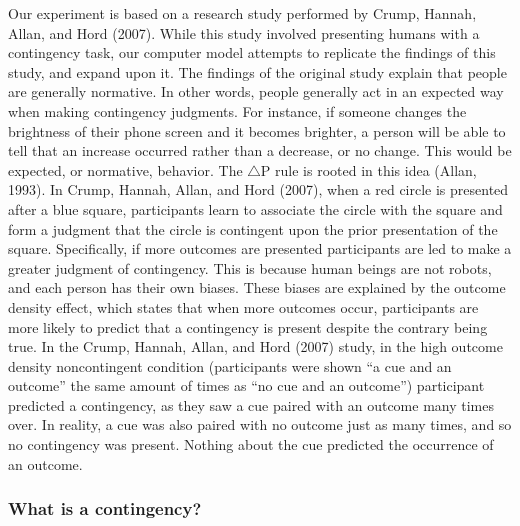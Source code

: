 \documentclass[
  english,
  man,floatsintext]{apa6}
\begin{document}
Our experiment is based on a research study performed by Crump, Hannah, Allan, and Hord (2007). While this study involved presenting humans with a contingency task, our computer model attempts to replicate the findings of this study, and expand upon it. The findings of the original study explain that people are generally normative. In other words, people generally act in an expected way when making contingency judgments. For instance, if someone changes the brightness of their phone screen and it becomes brighter, a person will be able to tell that an increase occurred rather than a decrease, or no change. This would be expected, or normative, behavior. The \(\triangle\)P rule is rooted in this idea (Allan, 1993). In Crump, Hannah, Allan, and Hord (2007), when a red circle is presented after a blue square, participants learn to associate the circle with the square and form a judgment that the circle is contingent upon the prior presentation of the square. Specifically, if more outcomes are presented participants are led to make a greater judgment of contingency. This is because human beings are not robots, and each person has their own biases. These biases are explained by the outcome density effect, which states that when more outcomes occur, participants are more likely to predict that a contingency is present despite the contrary being true. In the Crump, Hannah, Allan, and Hord (2007) study, in the high outcome density noncontingent condition (participants were shown ``a cue and an outcome'' the same amount of times as ``no cue and an outcome'') participant predicted a contingency, as they saw a cue paired with an outcome many times over. In reality, a cue was also paired with no outcome just as many times, and so no contingency was present. Nothing about the cue predicted the occurrence of an outcome.

\hypertarget{what-is-a-contingency}{%
\subsubsection{What is a contingency?}\label{what-is-a-contingency}}
\end{document}
